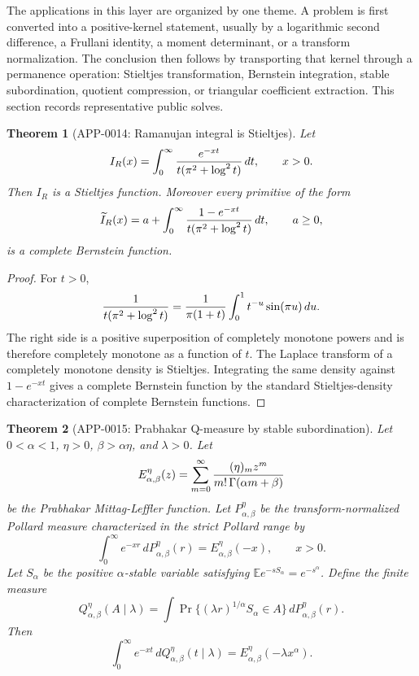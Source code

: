 \documentclass[11pt]{article}
\numberwithin{equation}{section}
\newtheorem{theorem}{Theorem}[section]
\theoremstyle{definition}
\theoremstyle{remark}
\newcommand{\1}{\mathbf 1}
\begin{document}
The applications in this layer are organized by one theme.  A problem is first converted
into a positive-kernel statement, usually by a logarithmic second difference, a
Frullani identity, a moment determinant, or a transform normalization.  The
conclusion then follows by transporting that kernel through a permanence
operation: Stieltjes transformation, Bernstein integration, stable
subordination, quotient compression, or triangular coefficient extraction.  This
section records representative public solves.

\begin{theorem}[APP-0014: Ramanujan integral is Stieltjes]
\label{thm:app14-ramanujan-stieltjes}
Let
\[
  I_R(x)=\int_0^\infty {e^{-xt}\over t(\pi^2+\log^2 t)}\,dt,
  \qquad x>0 .
\]
Then \(I_R\) is a Stieltjes function.  Moreover every primitive of the form
\[
  \widetilde I_R(x)=a+\int_0^\infty
       {1-e^{-xt}\over t(\pi^2+\log^2 t)}\,dt,\qquad a\ge0,
\]
is a complete Bernstein function.
\end{theorem}

\begin{proof}
For \(t>0\),
\[
 {1\over t(\pi^2+\log^2t)}
   ={1\over \pi(1+t)}\int_0^1 t^{-u}\sin(\pi u)\,du .
\]
The right side is a positive superposition of completely monotone powers and is
therefore completely monotone as a function of \(t\).  The Laplace transform of
a completely monotone density is Stieltjes.  Integrating the same density
against \(1-e^{-xt}\) gives a complete Bernstein function by the standard
Stieltjes-density characterization of complete Bernstein functions.
\end{proof}

\begin{theorem}[APP-0015: Prabhakar Q-measure by stable subordination]
\label{thm:app15-prabhakar-subordination}
Let \(0<\alpha<1\), \(\eta>0\), \(\beta>\alpha\eta\), and \(\lambda>0\).
Let
\[
  E_{\alpha,\beta}^{\eta}(z)
  =\sum_{m=0}^{\infty}{(\eta)_m z^m\over m!\,\Gamma(\alpha m+\beta)}
\]
be the Prabhakar Mittag-Leffler function.  Let
\(P_{\alpha,\beta}^{\eta}\) be the transform-normalized Pollard measure
characterized in the strict Pollard range by
\[
  \int_0^\infty e^{-xr}\,dP_{\alpha,\beta}^{\eta}(r)
  =E_{\alpha,\beta}^{\eta}(-x),\qquad x>0.
\]
Let \(S_\alpha\) be the positive \(\alpha\)-stable variable satisfying
\(\mathbb E e^{-sS_\alpha}=e^{-s^\alpha}\).  Define the finite measure
\[
  Q_{\alpha,\beta}^{\eta}(A\mid\lambda)
  =\int \Pr\{(\lambda r)^{1/\alpha}S_\alpha\in A\}\,
       dP_{\alpha,\beta}^{\eta}(r).
\]
Then
\[
  \int_0^\infty e^{-xt}\,dQ_{\alpha,\beta}^{\eta}(t\mid\lambda)
  =E_{\alpha,\beta}^{\eta}(-\lambda x^\alpha).
\]
\end{theorem}
\end{document}
